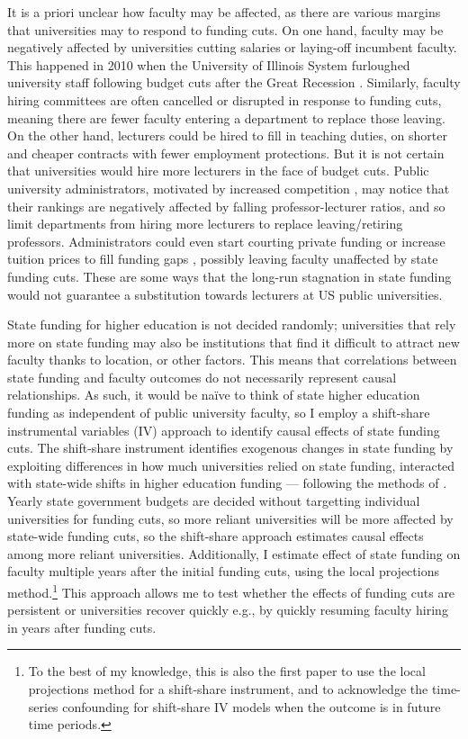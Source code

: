 It is a priori unclear how faculty may be affected, as there are various margins that universities may to respond to funding cuts.
On one hand, faculty may be negatively affected by universities cutting salaries or laying-off incumbent faculty.
This happened in 2010 when the University of Illinois System furloughed university staff following budget cuts after the Great Recession \citep{furlough2010}.
Similarly, faculty hiring committees are often cancelled or disrupted in response to funding cuts, meaning there are fewer faculty entering a department to replace those leaving.
On the other hand, lecturers could be hired to fill in teaching duties, on shorter and cheaper contracts with fewer employment protections.
But it is not certain that universities would hire more lecturers in the face of budget cuts.
Public university administrators, motivated by increased competition \citep{hoxby2009changing,urquiola2020markets}, may notice that their rankings are negatively affected by falling professor-lecturer ratios, and so limit departments from hiring more lecturers to replace leaving/retiring professors.
Administrators could even start courting private funding or increase tuition prices to fill funding gaps \citep{bound2019public}, possibly leaving faculty unaffected by state funding cuts.
These are some ways that the long-run stagnation in state funding would not guarantee a substitution towards lecturers at US public universities.

State funding for higher education is not decided randomly;
universities that rely more on state funding may also be institutions that find it difficult to attract new faculty thanks to location, or other factors.
This means that correlations between state funding and faculty outcomes do not necessarily represent causal relationships.
As such, it would be na\"ive to think of state higher education funding as independent of public university faculty, so I employ a shift-share instrumental variables (IV) approach to identify causal effects of state funding cuts.
The shift-share instrument identifies exogenous changes in state funding by exploiting differences in how much universities relied on state funding, interacted with state-wide shifts in higher education funding --- following the methods of \cite{NBERw23736,NBERw27885}.
Yearly state government budgets are decided without targetting individual universities for funding cuts, so more reliant universities will be more affected by state-wide funding cuts, so the shift-share approach estimates causal effects among more reliant universities.
Additionally, I estimate effect of state funding on faculty multiple years after the initial funding cuts, using the local projections method.\footnote{
    To the best of my knowledge, this is also the first paper to use the local projections method for a shift-share instrument, and to acknowledge the time-series confounding for shift-share IV models when the outcome is in future time periods.
}
This approach allows me to test whether the effects of funding cuts are persistent or universities recover quickly e.g., by quickly resuming faculty hiring in years after funding cuts.

